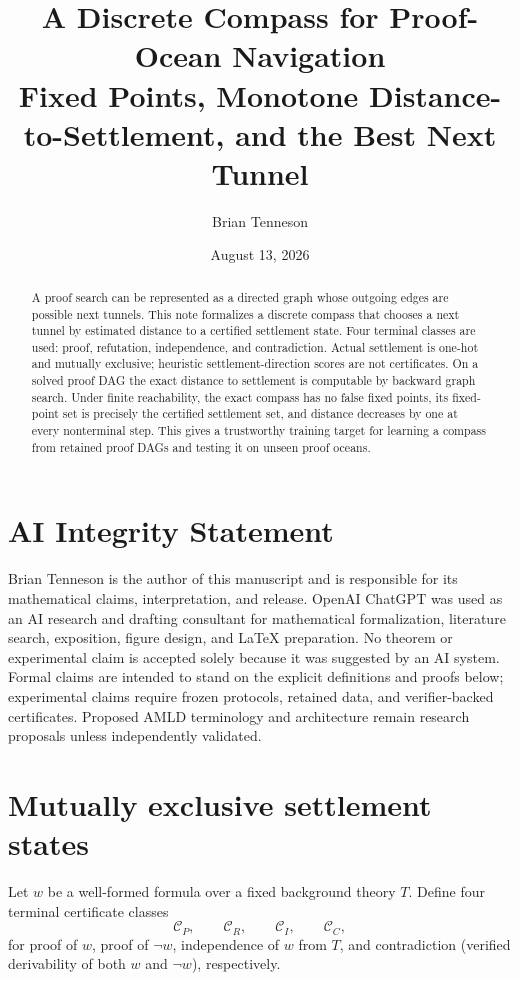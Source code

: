 \documentclass[11pt]{article}
\title{\textbf{A Discrete Compass for Proof-Ocean Navigation}\\[4pt]\large Fixed Points, Monotone Distance-to-Settlement, and the Best Next Tunnel}
\author{Brian Tenneson}
\date{August 13, 2026}
\newcommand{\Cset}{\mathcal C}
\begin{document}
\maketitle

\begin{abstract}
A proof search can be represented as a directed graph whose outgoing edges are possible next tunnels. This note formalizes a discrete compass that chooses a next tunnel by estimated distance to a certified settlement state. Four terminal classes are used: proof, refutation, independence, and contradiction. Actual settlement is one-hot and mutually exclusive; heuristic settlement-direction scores are not certificates. On a solved proof DAG the exact distance to settlement is computable by backward graph search. Under finite reachability, the exact compass has no false fixed points, its fixed-point set is precisely the certified settlement set, and distance decreases by one at every nonterminal step. This gives a trustworthy training target for learning a compass from retained proof DAGs and testing it on unseen proof oceans.
\end{abstract}

\section*{AI Integrity Statement}
Brian Tenneson is the author of this manuscript and is responsible for its mathematical claims, interpretation, and release. OpenAI ChatGPT was used as an AI research and drafting consultant for mathematical formalization, literature search, exposition, figure design, and LaTeX preparation. No theorem or experimental claim is accepted solely because it was suggested by an AI system. Formal claims are intended to stand on the explicit definitions and proofs below; experimental claims require frozen protocols, retained data, and verifier-backed certificates. Proposed AMLD terminology and architecture remain research proposals unless independently validated.

\section{Mutually exclusive settlement states}
Let $w$ be a well-formed formula over a fixed background theory $T$. Define four terminal certificate classes
\[
\Cset_P,\qquad \Cset_R,\qquad \Cset_I,\qquad \Cset_C,
\]
for proof of $w$, proof of $\neg w$, independence of $w$ from $T$, and contradiction (verified derivability of both $w$ and $\neg w$), respectively.
\end{document}
